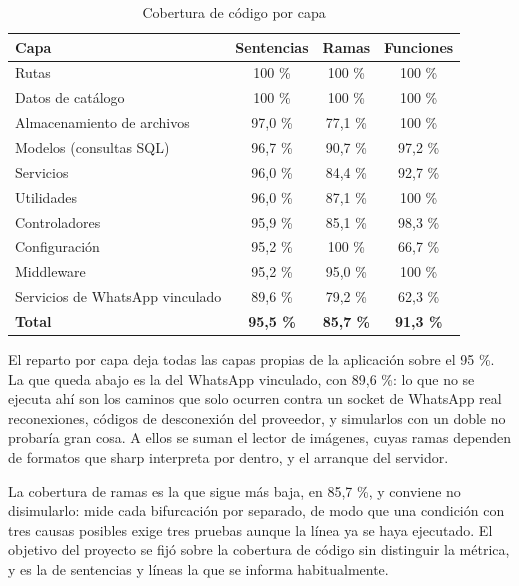 \documentclass[12pt,letterpaper,oneside]{report}
\begin{document}
\begin{table}[H]
  \centering
  \caption{Cobertura de código por capa}
  \label{tab:cobertura}
  \renewcommand{\arraystretch}{1.2}
  \begin{tabular}{|p{6.2cm}|c|c|c|}
    \hline
    \textbf{Capa} & \textbf{Sentencias} & \textbf{Ramas} & \textbf{Funciones} \\
    \hline
    Rutas & 100 \% & 100 \% & 100 \% \\ \hline
    Datos de catálogo & 100 \% & 100 \% & 100 \% \\ \hline
    Almacenamiento de archivos & 97,0 \% & 77,1 \% & 100 \% \\ \hline
    Modelos (consultas SQL) & 96,7 \% & 90,7 \% & 97,2 \% \\ \hline
    Servicios & 96,0 \% & 84,4 \% & 92,7 \% \\ \hline
    Utilidades & 96,0 \% & 87,1 \% & 100 \% \\ \hline
    Controladores & 95,9 \% & 85,1 \% & 98,3 \% \\ \hline
    Configuración & 95,2 \% & 100 \% & 66,7 \% \\ \hline
    Middleware & 95,2 \% & 95,0 \% & 100 \% \\ \hline
    Servicios de WhatsApp vinculado & 89,6 \% & 79,2 \% & 62,3 \% \\ \hline
    \textbf{Total} & \textbf{95,5 \%} & \textbf{85,7 \%} & \textbf{91,3 \%} \\ \hline
  \end{tabular}
\end{table}

El reparto por capa deja todas las capas propias de la aplicación sobre el 95 \%. La que queda abajo es la del WhatsApp vinculado, con 89,6 \%: lo que no se ejecuta ahí son los caminos que solo ocurren contra un socket de WhatsApp real reconexiones, códigos de desconexión del proveedor, y simularlos con un doble no probaría gran cosa. A ellos se suman el lector de imágenes, cuyas ramas dependen de formatos que sharp interpreta por dentro, y el arranque del servidor.


La cobertura de ramas es la que sigue más baja, en 85,7 \%, y conviene no disimularlo: mide cada bifurcación por separado, de modo que una condición con tres causas posibles exige tres pruebas aunque la línea ya se haya ejecutado. El objetivo del proyecto se fijó sobre la cobertura de código sin distinguir la métrica, y es la de sentencias y líneas la que se informa habitualmente.
\end{document}
